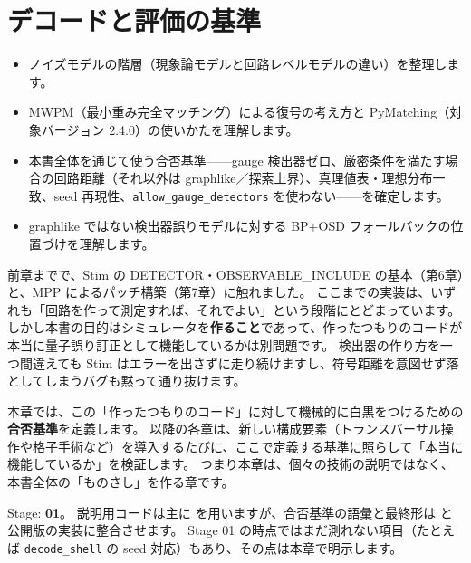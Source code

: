 \chapter{デコードと評価の基準}\label{ch:decoding}

\begin{chaptergoal}
  \begin{itemize}
  \item ノイズモデルの階層（現象論モデルと回路レベルモデルの違い）を整理します。
  \item MWPM（最小重み完全マッチング）による復号の考え方と PyMatching（対象バージョン 2.4.0）の使いかたを理解します\cite{higgott2022pymatching,higgott2025sparse}。
  \item 本書全体を通じて使う合否基準——gauge 検出器ゼロ、厳密条件を満たす場合の回路距離（それ以外は graphlike／探索上界）、真理値表・理想分布一致、seed 再現性、\texttt{allow\_gauge\_detectors} を使わない——を確定します。
  \item graphlike ではない検出器誤りモデルに対する BP+OSD フォールバックの位置づけを理解します。
  \end{itemize}
\end{chaptergoal}

前章までで、Stim の DETECTOR・OBSERVABLE\_INCLUDE の基本（第6章）と、MPP によるパッチ構築（第7章）に触れました。
ここまでの実装は、いずれも「回路を作って測定すれば、それでよい」という段階にとどまっています。
しかし本書の目的はシミュレータを\textbf{作ること}であって、作ったつもりのコードが本当に量子誤り訂正として機能しているかは別問題です。
検出器の作り方を一つ間違えても Stim はエラーを出さずに走り続けますし、符号距離を意図せず落としてしまうバグも黙って通り抜けます。

本章では、この「作ったつもりのコード」に対して機械的に白黒をつけるための\textbf{合否基準}を定義します。
以降の各章は、新しい構成要素（トランスバーサル操作や格子手術など）を導入するたびに、ここで定義する基準に照らして「本当に機能しているか」を検証します。
つまり本章は、個々の技術の説明ではなく、本書全体の「ものさし」を作る章です。

\begin{notebox}
  Stage: \textbf{01}。
  説明用コードは主に  を用いますが、合否基準の語彙と最終形は  と公開版の実装に整合させます。
  Stage 01 の時点ではまだ測れない項目（たとえば \texttt{decode\_shell} の seed 対応）もあり、その点は本章で明示します。
\end{notebox}


